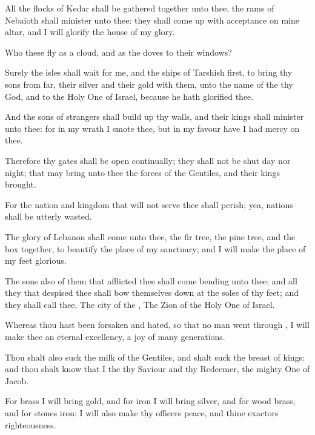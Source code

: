 {All the
flocks of
Kedar shall be gathered
together unto thee, the
rams of
Nebaioth shall
minister unto thee: they shall come
up with
acceptance on mine
altar, and I will
glorify the
house of my
glory.

Who
{} these
{}
fly as a
cloud, and as the
doves to their
windows?


\par }{\PP {}Surely the
isles shall
wait for me, and the
ships of
Tarshish
first, to
bring thy
sons from
far, their
silver and their
gold with them, unto the
name of the
{} thy
God, and to the Holy
One of
Israel, because he hath
glorified thee.

And the
sons of
strangers shall build
up thy
walls, and their
kings shall
minister unto thee: for in my
wrath I
smote thee, but in my
favour have I had
mercy on thee.

Therefore thy
gates shall be
open
continually; they shall not be
shut
day nor
night; that
{} may
bring unto thee the
forces of the
Gentiles, and
{} their
kings
{}
brought.

For the
nation and
kingdom that will not
serve thee shall
perish; yea,
{}
nations shall be
utterly
wasted.

The
glory of
Lebanon shall
come unto thee, the fir
tree, the pine
tree, and the
box
together, to
beautify the
place of my
sanctuary; and I will make the
place of my
feet
glorious.

The
sons also of them that
afflicted thee shall
come
bending unto thee; and all they that
despised thee shall bow themselves
down at the
soles of thy
feet; and they shall
call thee, The
city of the
{}, The
Zion of the Holy
One of
Israel.


\par }{\PP {}Whereas thou hast been
forsaken and
hated, so that no man went
through
{}, I will
make thee an
eternal
excellency, a
joy of
many
generations.

Thou shalt also
suck the
milk of the
Gentiles, and shalt
suck the
breast of
kings: and thou shalt
know that I the
{}
{} thy
Saviour and thy
Redeemer, the mighty
One of
Jacob.

For
brass I will
bring
gold, and for
iron I will
bring
silver, and for
wood
brass, and for
stones
iron: I will also
make thy
officers
peace, and thine
exactors
righteousness.

}
